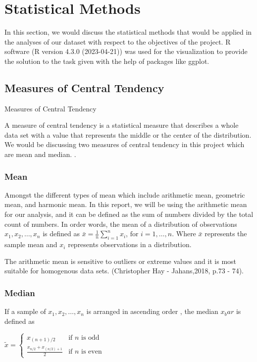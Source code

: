 \documentclass[12 pt]{scrartcl}
\begin{document}
\section{Statistical Methods}

In this section, we would discuss the statistical methods that would be applied in the analyses of our dataset with respect to the objectives of the project. R software (R version 4.3.0 (2023-04-21)) was used for the visualization to provide the solution to the task given with the help of packages like ggplot.

\subsection{Measures of Central Tendency}

Measures of Central Tendency

A measure of central tendency is a statistical measure that describes a whole data set with a value that represents the middle or the center of the distribution. We would be discussing two measures of central tendency in this project which are mean and median. \citep{Hay}.
\subsubsection{Mean}

Amongst the different types of mean which include arithmetic mean, geometric mean, and harmonic mean. In this report, we will be using the arithmetic mean for our analysis, and it can be defined as the sum of numbers divided by the total count of numbers. In order words, the mean of a distribution of observations  $x_1, x_2, \ldots, x_n$ is defined as $\bar{x} = \frac{1}{n}\sum_{i=1}^{n} x_i$, $\text{for }i=1,\ldots, n$. Where $\bar{x}$ represents the sample mean and $x_i$ represents observations in a distribution.

The arithmetic mean is sensitive to outliers or extreme values and it is most suitable for homogenous data sets. (Christopher Hay - Jahans,2018, p.73 - 74).


\subsubsection{Median}
 
 If a sample of $x_1, x_2, \ldots, x_n$ is arranged in ascending order , the median $x_bar$ is defined as
 
  $\tilde{x} = \begin{cases}x_{(n+1)/2} & \text{if $n$ is odd} \\\frac{x_{n/2}+x_{(n/2)+1}}{2} & \text{if $n$ is even} \end{cases}$ 
 
\end{document}
